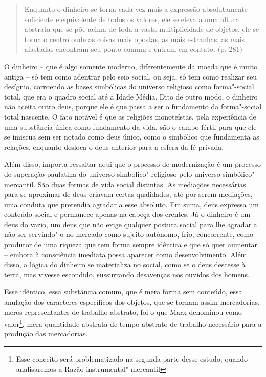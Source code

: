 \begin{quote}
Enquanto o dinheiro se torna cada vez mais a expressão absolutamente
suficiente e equivalente de todos os valores, ele se eleva a uma altura
abstrata que se põe acima de toda a vasta multiplicidade de objetos, ele
se torna o centro onde as coisas mais opostas, as mais estranhas, as
mais afastadas encontram seu ponto comum e entram em contato. (p. 281)
\end{quote}

O dinheiro -- que é algo somente moderno, diferentemente da
moeda que é muito antiga -- só tem como adentrar pelo seio social, ou
seja, só tem como realizar seu desígnio, corroendo as bases simbólicas do
universo religioso como forma"-social total, que era o quadro social até
a Idade Média. Dito de outro modo, o dinheiro não aceita outro deus,
porque ele é que passa a ser o fundamento da forma"-social total nascente. O fato
notável é que as religiões monoteístas, pela experiência de uma
substância única como fundamento da vida, são o campo fértil para que
ele se imiscua sem ser notado como deus único, como o simbólico que
fundamenta as relações, enquanto desloca o deus anterior para a esfera
da fé privada.

Além disso, importa ressaltar aqui que o processo de
modernização é um processo de superação paulatina do universo
simbólico"-religioso pelo universo simbólico"-mercantil. São duas formas
de vida social distintas. As mediações necessárias para se aproximar de
deus criavam certas qualidades, até por serem mediações, uma conduta que
pretendia agradar a esse absoluto. Em suma, deus expressa um conteúdo
social e permanece apenas na cabeça dos crentes. Já o dinheiro é um deus
do vazio, um deus que não exige qualquer postura social para lhe agradar
a não ser servindo"-o no mercado como sujeito autônomo, frio,
concorrente, como produtor de uma riqueza que tem forma sempre idêntica
e que só quer aumentar -- embora à consciência imediata possa aparecer
como desenvolvimento. Além disso, a lógica do dinheiro se materializa no
social, como se o deus descesse à terra, mas vivesse escondido,
sussurrando desavenças nos ouvidos dos homens.

Esse idêntico, essa substância comum, que é mera forma sem conteúdo,
essa anulação dos caracteres específicos dos objetos, que se tornam
assim mercadorias, meros representantes de trabalho abstrato, foi o que
Marx denominou como valor\footnote{Esse conceito será problematizado na
  segunda parte desse estudo, quando analisaremos a Razão
  instrumental"-mercantil}, mera quantidade abstrata de tempo abstrato de
trabalho necessário para a produção das mercadorias.

